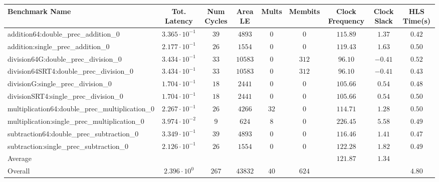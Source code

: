 \begin{tabular}{|l|c|c|c|c|c|c|c|c|}
\hline
Benchmark Name                                   & Tot. Latency            & Num Cycles & Area LE   & Mults  & Membits & Clock Frequency & Clock Slack & HLS Time(s) \\
\hline
addition64:double\_prec\_addition\_0             & $ 3.365 \cdot 10^{-1} $ & $ 39     $ & $ 4893  $ & $ 0  $ & $ 0   $ & $ 115.89      $ & $ 1.37    $ & $ 0.42    $ \\
addition:single\_prec\_addition\_0               & $ 2.177 \cdot 10^{-1} $ & $ 26     $ & $ 1554  $ & $ 0  $ & $ 0   $ & $ 119.43      $ & $ 1.63    $ & $ 0.50    $ \\
division64G:double\_prec\_division\_0            & $ 3.434 \cdot 10^{-1} $ & $ 33     $ & $ 10583 $ & $ 0  $ & $ 312 $ & $ 96.10       $ & $ -0.41   $ & $ 0.52    $ \\
division64SRT4:double\_prec\_division\_0         & $ 3.434 \cdot 10^{-1} $ & $ 33     $ & $ 10583 $ & $ 0  $ & $ 312 $ & $ 96.10       $ & $ -0.41   $ & $ 0.43    $ \\
divisionG:single\_prec\_division\_0              & $ 1.704 \cdot 10^{-1} $ & $ 18     $ & $ 2441  $ & $ 0  $ & $ 0   $ & $ 105.66      $ & $ 0.54    $ & $ 0.48    $ \\
divisionSRT4:single\_prec\_division\_0           & $ 1.704 \cdot 10^{-1} $ & $ 18     $ & $ 2441  $ & $ 0  $ & $ 0   $ & $ 105.66      $ & $ 0.54    $ & $ 0.50    $ \\
multiplication64:double\_prec\_multiplication\_0 & $ 2.267 \cdot 10^{-1} $ & $ 26     $ & $ 4266  $ & $ 32 $ & $ 0   $ & $ 114.71      $ & $ 1.28    $ & $ 0.50    $ \\
multiplication:single\_prec\_multiplication\_0   & $ 3.974 \cdot 10^{-2} $ & $ 9      $ & $ 624   $ & $ 8  $ & $ 0   $ & $ 226.45      $ & $ 5.58    $ & $ 0.49    $ \\
subtraction64:double\_prec\_subtraction\_0       & $ 3.349 \cdot 10^{-1} $ & $ 39     $ & $ 4893  $ & $ 0  $ & $ 0   $ & $ 116.46      $ & $ 1.41    $ & $ 0.47    $ \\
subtraction:single\_prec\_subtraction\_0         & $ 2.126 \cdot 10^{-1} $ & $ 26     $ & $ 1554  $ & $ 0  $ & $ 0   $ & $ 122.28      $ & $ 1.82    $ & $ 0.49    $ \\
\hline
Average                                          & $                     $ & $        $ & $       $ & $    $ & $     $ & $ 121.87      $ & $ 1.34    $ & $         $ \\
\hline
Overall                                          & $ 2.396 \cdot 10^{0}  $ & $ 267    $ & $ 43832 $ & $ 40 $ & $ 624 $ & $             $ & $         $ & $ 4.80    $ \\
\hline
\end{tabular}
